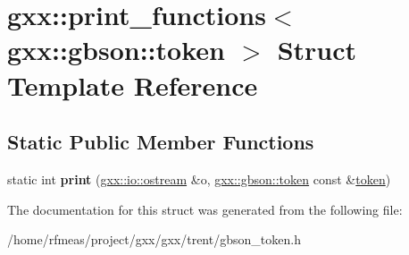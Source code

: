 \hypertarget{structgxx_1_1print__functions_3_01gxx_1_1gbson_1_1token_01_4}{}\section{gxx\+:\+:print\+\_\+functions$<$ gxx\+:\+:gbson\+:\+:token $>$ Struct Template Reference}
\label{structgxx_1_1print__functions_3_01gxx_1_1gbson_1_1token_01_4}
\subsection*{Static Public Member Functions}
\begin{DoxyCompactItemize}
\item 
static int {\bfseries print} (\hyperlink{classgxx_1_1io_1_1ostream}{gxx\+::io\+::ostream} \&o, \hyperlink{structgxx_1_1gbson_1_1token}{gxx\+::gbson\+::token} const \&\hyperlink{structgxx_1_1token}{token})\hypertarget{structgxx_1_1print__functions_3_01gxx_1_1gbson_1_1token_01_4_a99c65c6e90f9442db9ceceac9f21c253}{}\label{structgxx_1_1print__functions_3_01gxx_1_1gbson_1_1token_01_4_a99c65c6e90f9442db9ceceac9f21c253}

\end{DoxyCompactItemize}


The documentation for this struct was generated from the following file\+:\begin{DoxyCompactItemize}
\item 
/home/rfmeas/project/gxx/gxx/trent/gbson\+\_\+token.\+h\end{DoxyCompactItemize}
